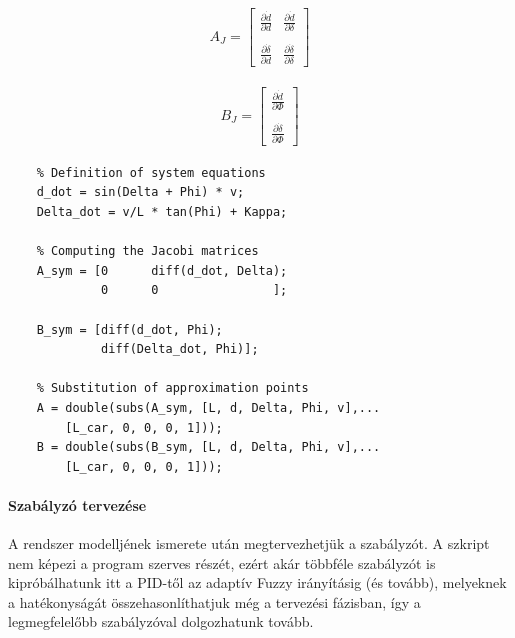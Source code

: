 \begin{minipage}{0.45\linewidth}
    \begin{align}
        A_J =
        \begin{bmatrix}
           \frac{\partial \dot{d}}{\partial d} & \frac{\partial \dot{d}}{\partial \delta} \\
           & \\
           \frac{\partial \dot{\delta}}{\partial d} & \frac{\partial \dot{\delta}}{\partial \delta}
         \end{bmatrix}
     \end{align}
\end{minipage}
\begin{minipage}{0.45\linewidth}
    \begin{align}
        B_J =
         \begin{bmatrix}
               \frac{\partial \dot{d}}{\partial \Phi} \\
               \\
               \frac{\partial \dot{\delta}}{\partial \Phi}
        \end{bmatrix}
     \end{align}
\end{minipage}

\begin{lstlisting}
    % Definition of system equations
    d_dot = sin(Delta + Phi) * v;
    Delta_dot = v/L * tan(Phi) + Kappa;
    
    % Computing the Jacobi matrices
    A_sym = [0      diff(d_dot, Delta);
             0      0                ];
       
    B_sym = [diff(d_dot, Phi);
             diff(Delta_dot, Phi)];
    
    % Substitution of approximation points
    A = double(subs(A_sym, [L, d, Delta, Phi, v],...
        [L_car, 0, 0, 0, 1]));
    B = double(subs(B_sym, [L, d, Delta, Phi, v],...
        [L_car, 0, 0, 0, 1]));
\end{lstlisting}

\paragraph{Szabályzó tervezése}

A rendszer modelljének ismerete után megtervezhetjük a szabályzót. A szkript nem képezi a program szerves részét, ezért akár többféle szabályzót is kipróbálhatunk itt a PID-től az adaptív Fuzzy irányításig (és tovább), melyeknek a hatékonyságát összehasonlíthatjuk még a tervezési fázisban, így a legmegfelelőbb szabályzóval dolgozhatunk tovább.

